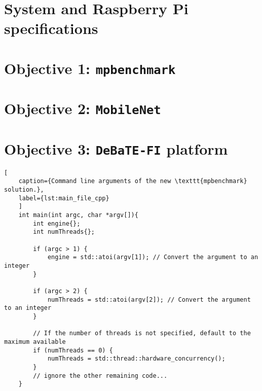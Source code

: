 \section{System and Raspberry Pi specifications}
\section{Objective 1: \texttt{mpbenchmark}}
\section{Objective 2: \texttt{MobileNet}}
\section{Objective 3: \texttt{DeBaTE-FI} platform}

\begin{lstlisting}[
	caption={Command line arguments of the new \texttt{mpbenchmark} solution.},
	label={lst:main_file_cpp}
	]
	int main(int argc, char *argv[]){
		int engine{};
		int numThreads{};
		
		if (argc > 1) {
			engine = std::atoi(argv[1]); // Convert the argument to an integer
		}
		
		if (argc > 2) {
			numThreads = std::atoi(argv[2]); // Convert the argument to an integer
		}
		
		// If the number of threads is not specified, default to the maximum available
		if (numThreads == 0) {
			numThreads = std::thread::hardware_concurrency();
		}	
		// ignore the other remaining code...
	}
\end{lstlisting}





